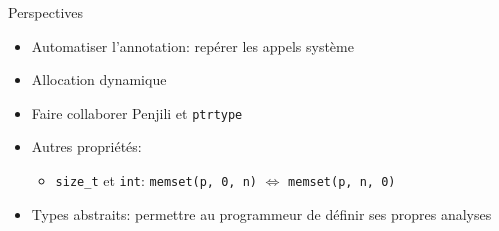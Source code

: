 \begin{frame}{Perspectives}
    \begin{itemize}
        \item Automatiser l'annotation: repérer les appels système
        \item Allocation dynamique
        \item Faire collaborer Penjili et \texttt{ptrtype}
        \item Autres propriétés:
            \begin{itemize}
                \item \texttt{size\_t} et \texttt{int}: \texttt{memset(p, 0, n)} $⇔$ \texttt{memset(p, n, 0)}
            \end{itemize}
        \item Types abstraits: permettre au programmeur de définir ses propres
            analyses
        \end{itemize}
\end{frame}
